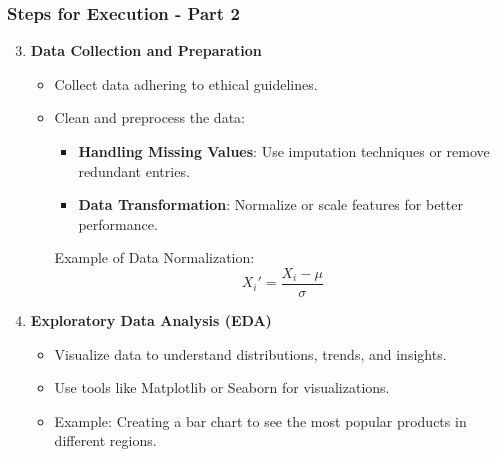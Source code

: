 \documentclass[aspectratio=169]{beamer}
\begin{document}
\begin{frame}
    \frametitle{Steps for Execution - Part 2}
    \begin{enumerate}
        \setcounter{enumi}{2} %
        \item \textbf{Data Collection and Preparation}
            \begin{itemize}
                \item Collect data adhering to ethical guidelines.
                \item Clean and preprocess the data:
                \begin{itemize}
                    \item \textbf{Handling Missing Values}: Use imputation techniques or remove redundant entries.
                    \item \textbf{Data Transformation}: Normalize or scale features for better performance.
                \end{itemize}
                Example of Data Normalization:
                \begin{equation}
                    X_i' = \frac{X_i - \mu}{\sigma} 
                \end{equation}
            \end{itemize}
        
        \item \textbf{Exploratory Data Analysis (EDA)}
            \begin{itemize}
                \item Visualize data to understand distributions, trends, and insights.
                \item Use tools like Matplotlib or Seaborn for visualizations.
                \item Example: Creating a bar chart to see the most popular products in different regions.
            \end{itemize}
    \end{enumerate}
\end{frame}
\end{document}
